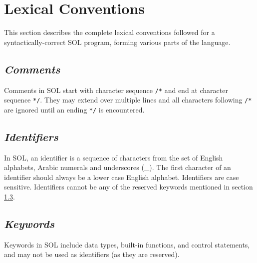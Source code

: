 \section{Lexical Conventions}

This section describes the complete lexical conventions followed for a syntactically-correct SOL program, forming various parts of the language.

    \subsection{\textit{Comments}}
    Comments in SOL start with character sequence \texttt{/*} and end at character sequence \texttt{*/}. They may extend over multiple lines and all characters following \texttt{/*} are ignored until an ending \texttt{*/} is encountered.

    \subsection{\textit{Identifiers}}\label{identifer}
    In SOL, an identifier is a sequence of characters from the set of English alphabets, Arabic numerals and underscores (\_). The first character of an identifier should always be a lower case English alphabet. Identifiers are case sensitive. Identifiers cannot be any of the reserved keywords mentioned in section \ref{keywords}.

    \subsection{\textit{Keywords}} \label{keywords}
    Keywords in SOL include data types, built-in functions, and control statements, and may not be used as identifiers (as they are reserved).

